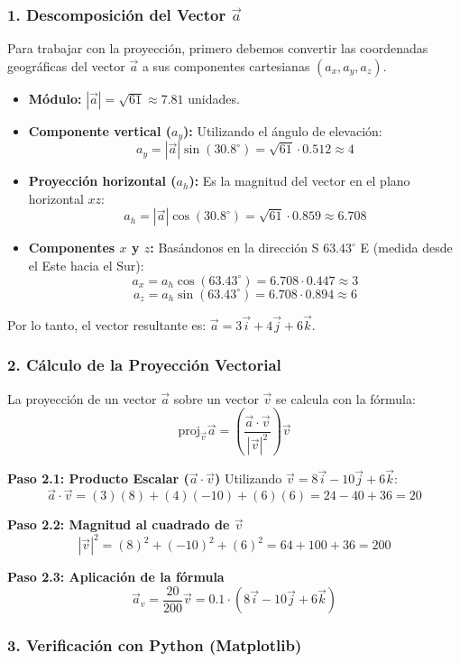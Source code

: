 \documentclass[12pt, a4paper]{article}
\begin{document}
\subsubsection*{1. Descomposición del Vector $\vec{a}$}
Para trabajar con la proyección, primero debemos convertir las coordenadas geográficas del vector $\vec{a}$ a sus componentes cartesianas $(a_x, a_y, a_z)$.

\begin{itemize}
    \item \textbf{Módulo:} $|\vec{a}| = \sqrt{61} \approx 7.81$ unidades.
    \item \textbf{Componente vertical ($a_y$):} Utilizando el ángulo de elevación:
    $$ a_y = |\vec{a}| \sin(30.8^\circ) = \sqrt{61} \cdot 0.512 \approx 4 $$
    \item \textbf{Proyección horizontal ($a_h$):} Es la magnitud del vector en el plano horizontal $xz$:
    $$ a_h = |\vec{a}| \cos(30.8^\circ) = \sqrt{61} \cdot 0.859 \approx 6.708 $$
    \item \textbf{Componentes $x$ y $z$:} Basándonos en la dirección S $63.43^\circ$ E (medida desde el Este hacia el Sur):
    $$ a_x = a_h \cos(63.43^\circ) = 6.708 \cdot 0.447 \approx 3 $$
    $$ a_z = a_h \sin(63.43^\circ) = 6.708 \cdot 0.894 \approx 6 $$
\end{itemize}

Por lo tanto, el vector resultante es: $\vec{a} = 3\vec{i} + 4\vec{j} + 6\vec{k}$.

\subsubsection*{2. Cálculo de la Proyección Vectorial}
La proyección de un vector $\vec{a}$ sobre un vector $\vec{v}$ se calcula con la fórmula:
$$ \text{proj}_{\vec{v}} \vec{a} = \left( \frac{\vec{a} \cdot \vec{v}}{|\vec{v}|^2} \right) \vec{v} $$

\textbf{Paso 2.1: Producto Escalar ($\vec{a} \cdot \vec{v}$)}
Utilizando $\vec{v} = 8\vec{i} - 10\vec{j} + 6\vec{k}$:
$$ \vec{a} \cdot \vec{v} = (3)(8) + (4)(-10) + (6)(6) = 24 - 40 + 36 = 20 $$

\textbf{Paso 2.2: Magnitud al cuadrado de $\vec{v}$}
$$ |\vec{v}|^2 = (8)^2 + (-10)^2 + (6)^2 = 64 + 100 + 36 = 200 $$

\textbf{Paso 2.3: Aplicación de la fórmula}
$$ \vec{a}_v = \frac{20}{200} \vec{v} = 0.1 \cdot (8\vec{i} - 10\vec{j} + 6\vec{k}) $$

\subsubsection*{3. Verificación con Python (Matplotlib)}
\end{document}
